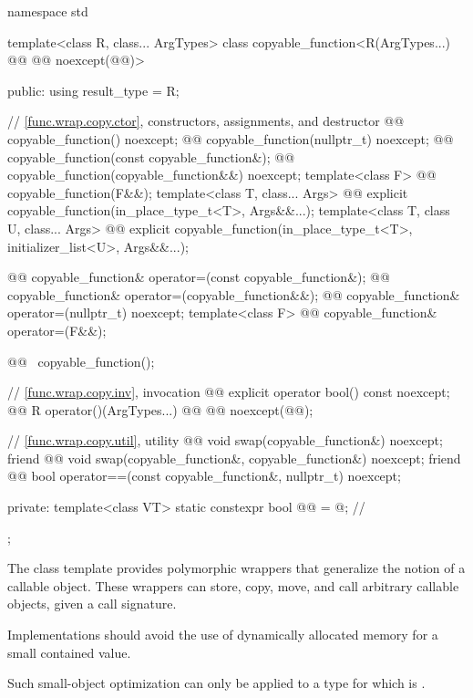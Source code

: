 \begin{codeblock}
namespace std {
  template<class R, class... ArgTypes>
  class copyable_function<R(ArgTypes...) @\cv{}@ @@ noexcept(@@)> {
  public:
    using result_type = R;

    // \ref{func.wrap.copy.ctor}, constructors, assignments, and destructor
    @@ copyable_function() noexcept;
    @@ copyable_function(nullptr_t) noexcept;
    @@ copyable_function(const copyable_function&);
    @@ copyable_function(copyable_function&&) noexcept;
    template<class F> @@ copyable_function(F&&);
    template<class T, class... Args>
      @@ explicit copyable_function(in_place_type_t<T>, Args&&...);
    template<class T, class U, class... Args>
      @@ explicit copyable_function(in_place_type_t<T>, initializer_list<U>, Args&&...);

    @@ copyable_function& operator=(const copyable_function&);
    @@ copyable_function& operator=(copyable_function&&);
    @@ copyable_function& operator=(nullptr_t) noexcept;
    template<class F> @@ copyable_function& operator=(F&&);

    @@ ~copyable_function();

    // \ref{func.wrap.copy.inv}, invocation
    @@ explicit operator bool() const noexcept;
    @@ R operator()(ArgTypes...) @\cv{}@ @@ noexcept(@@);

    // \ref{func.wrap.copy.util}, utility
    @@ void swap(copyable_function&) noexcept;
    friend @@ void swap(copyable_function&, copyable_function&) noexcept;
    friend @@ bool operator==(const copyable_function&, nullptr_t) noexcept;

  private:
    template<class VT>
      static constexpr bool @@ = @\seebelow@;       // \expos
  };
}
\end{codeblock}

\pnum
The  class template provides polymorphic wrappers that generalize the notion of a callable object. These wrappers can store, copy, move, and call arbitrary callable objects, given a call signature.

\pnum
\recommended
Implementations should avoid the use of dynamically allocated memory for a small contained value.
\begin{note}
Such small-object optimization can only be applied to a type  for which  is .
\end{note}

